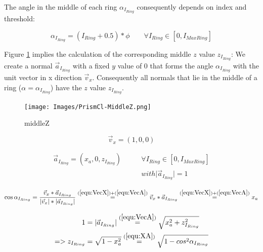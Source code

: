 \documentclass[../ClassicThesis.tex]{subfiles}
\begin{document}
The angle in the middle of each ring ${\alpha}_{I_{Ring}}$ consequently depends on index and threshold:

\begin{equation}
\label{equ:AlphaIRing}
    {\alpha}_{I_{Ring}} = (I_{Ring} + 0.5) * \phi \qquad \forall{ I_{Ring} \in [0, I_{MaxRing}] }
\end{equation}



Figure \ref{fig:middleZ} implies the calculation of the corresponding middle $z$ value $z_{I_{Ring}}$: We create a normal $\vec{a}_{I_{Ring}}$ with a fixed $y$ value of 0 that forms the angle ${\alpha}_{I_{Ring}}$ with the unit vector in x direction $\vec{v}_{x}$. Consequently all normals that lie in the middle of a ring ($\alpha = {\alpha}_{I_{Ring}}$) have the $z$ value $z_{I_{Ring}}$.

\begin{figure}
    \texttt{[image: Images/PrismCl-MiddleZ.png]}
    \caption{middleZ}
    \label{fig:middleZ}
\end{figure}

\begin{equation}
\label{equ:VecX}
    \vec{v}_{x} = (1, 0, 0)
\end{equation}

\begin{equation}
\begin{split}
    \label{equ:VecA}
    \vec{a}_{I_{Ring}} = (x_{a}, 0, z_{I_{Ring}}) \qquad  & \forall{ I_{Ring} \in [0, I_{MaxRing}] } \\
    & with \vert \vec{a}_{I_{Ring}} \vert = 1
\end{split}
\end{equation}

\begin{equation}
    \label{equ:XA}
    \cos{{\alpha}_{I_{Ring}}} = \frac{ \vec{v}_{x} * \vec{a}_{I_{Ring}} }{ \vert \vec{v}_{x} \vert * \vert \vec{a}_{I_{Ring}} \vert }
    \stackrel{(\ref{equ:VecX}) + (\ref{equ:VecA})}{=} \vec{v}_{x} * \vec{a}_{I_{Ring}}
    \stackrel{(\ref{equ:VecX}) + (\ref{equ:VecA})}{=} x_{a}
\end{equation}

\begin{equation}
\label{equ:ZIRing}
\begin{split}
    1 & = \vert \vec{a}_{I_{Ring}} \vert \stackrel{(\ref{equ:VecA})}{=} \sqrt{ x_{a}^{2} + z_{I_{Ring}}^{2} } \\
    => z_{I_{Ring}} & = \sqrt{1 - x_{a}^{2}}
    \stackrel{(\ref{equ:XA})}{=} \sqrt{1 - cos^{2}{{\alpha}_{I_{Ring}}}}
\end{split}
\end{equation}
\end{document}
